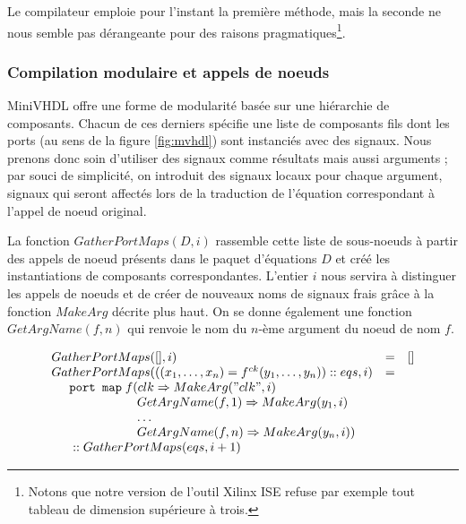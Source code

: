 \documentclass[a4paper]{article}
\newcommand{\mybox}[1]{\mbox{\tt{#1}}}
\newcommand{\ind}[0]{\hspace{0.5cm}}
\newcommand{\Cons}[0]{\; \mathbf{::} \;}
\newcommand{\App}[2]{#1^{ck}(#2)}
\begin{document}
Le compilateur emploie pour l'instant la premi\`ere m\'ethode, mais la seconde ne
nous semble pas d\'erangeante pour des raisons pragmatiques\footnote{Notons que
  notre version de l'outil Xilinx ISE refuse par exemple tout tableau de
  dimension sup\'erieure \`a trois.}.

\subsubsection{Compilation modulaire et appels de noeuds}

MiniVHDL offre une forme de modularit\'e bas\'ee sur une hi\'erarchie de
composants. Chacun de ces derniers sp\'ecifie une liste de composants fils dont
les ports (au sens de la figure \ref{fig:mvhdl}) sont instanci\'es avec des
signaux. Nous prenons donc soin d'utiliser des signaux comme r\'esultats mais
aussi arguments ; par souci de simplicit\'e, on introduit des signaux locaux pour
chaque argument, signaux qui seront affect\'es lors de la traduction de l'\'equation
correspondant \`a l'appel de noeud original.

La fonction $GatherPortMaps(D, i)$ rassemble cette liste de sous-noeuds \`a partir
des appels de noeud pr\'esents dans le paquet d'\'equations $D$ et cr\'e\'e les
instantiations de composants correspondantes. L'entier $i$ nous servira \`a
distinguer les appels de noeuds et de cr\'eer de nouveaux noms de signaux frais
gr\^ace \`a la fonction $MakeArg$ d\'ecrite plus haut. On se donne \'egalement une
fonction $GetArgName(f,n)$ qui renvoie le nom du $n$-\`eme argument du noeud de
nom $f$.

\newcommand{\GPM}[2]{GatherPortMaps(#1,#2)}
\newcommand{\GAN}[2]{GetArgName(#1,#2)}

\[
\begin{array}{lcl}
  \GPM{[]}{i} & = & [] \\
  \GPM{((x_1,\dots,x_n) = \App{f}{y_1,\dots,y_n}) \Cons eqs}{i} & = &
  \\
  \ind \mybox{port map} \; f ( clk \Rightarrow \MA{"clk"}{i} \\
  \ind \ind \ind \ind \hspace{0.4cm} \GAN{f}{1} \Rightarrow \MA{y_1}{i} \\
  \ind \ind \ind \ind \hspace{0.4cm} \dots \\
  \ind \ind \ind \ind \hspace{0.4cm} \GAN{f}{n} \Rightarrow \MA{y_n}{i}) \\
  \ind \Cons \GPM{eqs}{i + 1}
\end{array}
\]
\end{document}

